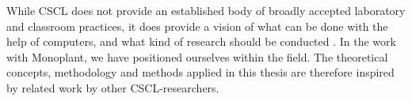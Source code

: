 While CSCL does not provide an established body of broadly accepted laboratory and classroom practices, it does provide a vision of what can be done with the help of computers, and what kind of research should be conducted \citep{stahl2006computer,ludvigsen2010computer}. In the work with Monoplant, we have positioned ourselves within the field. The theoretical concepts, methodology and methods applied in this thesis are therefore inspired by related work by other CSCL-researchers.







